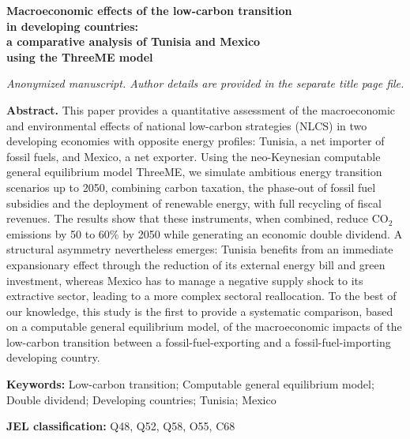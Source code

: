 \documentclass[12pt, a4paper]{article}
\begin{document}
\begin{titlepage}
\centering
\vspace*{1cm}

{\LARGE\bfseries Macroeconomic effects of the low-carbon transition\\
in developing countries:\\
a comparative analysis of Tunisia and Mexico\\
using the ThreeME model\par}

\vspace{1cm}

{\normalsize\itshape Anonymized manuscript. Author details are provided in the separate title page file.\par}

\vspace{1.5cm}

\textbf{Abstract.} This paper provides a quantitative assessment of the macroeconomic and environmental effects of national low-carbon strategies (NLCS) in two developing economies with opposite energy profiles: Tunisia, a net importer of fossil fuels, and Mexico, a net exporter. Using the neo-Keynesian computable general equilibrium model ThreeME, we simulate ambitious energy transition scenarios up to 2050, combining carbon taxation, the phase-out of fossil fuel subsidies and the deployment of renewable energy, with full recycling of fiscal revenues. The results show that these instruments, when combined, reduce CO$_2$ emissions by 50 to 60\% by 2050 while generating an economic double dividend. A structural asymmetry nevertheless emerges: Tunisia benefits from an immediate expansionary effect through the reduction of its external energy bill and green investment, whereas Mexico has to manage a negative supply shock to its extractive sector, leading to a more complex sectoral reallocation. To the best of our knowledge, this study is the first to provide a systematic comparison, based on a computable general equilibrium model, of the macroeconomic impacts of the low-carbon transition between a fossil-fuel-exporting and a fossil-fuel-importing developing country.

\vspace{0.8cm}

\textbf{Keywords:} Low-carbon transition; Computable general equilibrium model; Double dividend; Developing countries; Tunisia; Mexico

\textbf{JEL classification:} Q48, Q52, Q58, O55, C68

\vfill
\end{titlepage}
\end{document}
